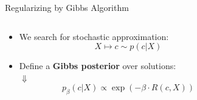 \documentclass[presentation,12pt]{beamer}
\begin{document}
\begin{frame}{Regularizing by Gibbs Algorithm}
\begin{columns}[T]
    \begin{column}{0.6\textwidth}
    \begin{itemize}
    \setlength\itemsep{1em}
    \item<+-> We search for stochastic approximation: 
    \[
      X \longmapsto c \sim p(c|X)
    \]
    \item<+-> Define a \textbf{Gibbs posterior} over solutions: \\
    \vspace*{6pt} 
    \hspace{5em} $\Downarrow$ 
    \[
      p_\beta(c|X) \propto \exp( - \beta \cdot R(c,X))
    \]
  \end{itemize}
  \end{column}

    \begin{column}{0.4\textwidth}
    \end{column}

\end{columns}
\end{frame}
\end{document}
